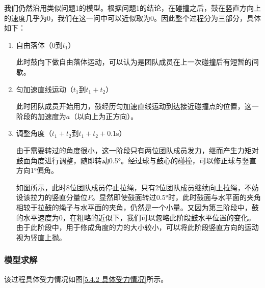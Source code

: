 \documentclass[nocover]{cumcmart}%
\begin{document}
我们仍然沿用类似问题1的模型。根据问题1的结论，在碰撞之后，鼓在竖直方向上的速度几乎为0，我们在这一问中可以近似取为0。因此整个过程分为三部分，具体如下：
\begin{enumerate}
    \item 自由落体（0到$t_1$）
    
    此时鼓向下做自由落体运动，可以认为是团队成员在上一次碰撞后有短暂的间歇。
    \item 匀加速直线运动（$t_1$到$t_1+t_2$）
    
    此时团队成员开始用力，鼓经历匀加速直线运动到达接近碰撞点的位置，这一阶段的加速度为$a$（以向上为正方向）。
    
    \item 调整角度（$t_1+t_2$到$t_1+t_2+0.1$s）
    
    由于需要转过的角度很小，这一阶段只有两位团队成员发力，继而产生力矩对鼓面角度进行调整，随即转动0.5°。经过球与鼓心的碰撞，可以修正球与竖直方向1°偏角。
    
    如图所示，此时8位团队成员停止拉绳，只有2位团队成员继续向上拉绳，不妨设该拉力的竖直分量位$F$。显然即使鼓面转过0.5°时，此时鼓面与水平面的夹角相较于拉鼓的绳子与水平面的夹角，仍然是一个小量。又因为第三阶段中，鼓的水平速度为0，在粗略的近似下，我们可以忽略此阶段鼓水平位置的变化。由于此阶段中，用于修成角度的力的大小较小，可以将此阶段竖直方向的运动视为竖直上抛。
    
\end{enumerate}

\subsubsection{模型求解}
该过程具体受力情况如图\ref{5.4.2 具体受力情况}所示。
\end{document}
